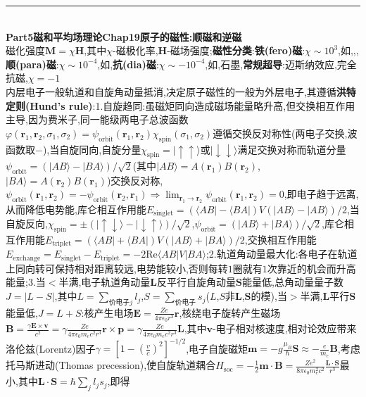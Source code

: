 \documentclass[UTF8,10pt,a4paper]{article}
\providecommand{\abs}[1]{\lvert#1\rvert}
\providecommand{\re}{\mathrm{Re}}
\begin{document}
\begin{multicols}{2}
\rule{\columnwidth}{.2pt}\\
\textbf{Part5磁和平均场理论Chap19原子的磁性:顺磁和逆磁}\\
磁化强度$\bm{M}=\chi\bm{H}$,其中$\chi$-磁极化率,$\bm{H}$-磁场强度;\textbf{磁性分类}:\textbf{铁(fero)磁}:$\chi\sim 10^3$,如,,,\textbf{顺(para)磁}:$\chi\sim 10^{-4}$,如,\textbf{抗(dia)磁}:$\chi\sim-10^{-4}$,如,石墨,\textbf{常规超导}:迈斯纳效应,完全抗磁,$\chi=-1$\\
内层电子一般轨道和自旋角动量抵消,决定原子磁性的一般为外层电子,其遵循\textbf{洪特定则(Hund's rule)}:1.自旋趋同:虽磁矩同向造成磁场能量略升高,但交换相互作用主导,因为费米子,同一能级两电子总波函数$\varphi(\bm{r}_1,\bm{r}_2,\sigma_1,\sigma_2)=\psi_{\text{orbit}}(\bm{r}_1,\bm{r}_2)\chi_{\text{spin}}(\sigma_1,\sigma_2)$遵循交换反对称性(两电子交换,波函数取$-$),当自旋同向,自旋分量$\chi_{\text{spin}}=\lvert\uparrow\uparrow\rangle$或$\lvert\downarrow\downarrow\rangle$满足交换对称而轨道分量$\psi_{\text{orbit}}=(\lvert AB\rangle-\lvert BA\rangle)/\sqrt{2}$(其中$\lvert AB\rangle=A(\bm{r}_1)B(\bm{r}_2)$,$\lvert BA\rangle=A(\bm{r}_2)B(\bm{r}_1)$)交换反对称,$\psi_{\text{orbit}}(\bm{r}_1,\bm{r}_2)=-\psi_{\text{orbit}}(\bm{r}_2,\bm{r}_1)\Rightarrow\lim_{\bm{r}_1\rightarrow\bm{r}_2}\psi_{\text{orbit}}(\bm{r}_1,\bm{r}_2)=0$,即电子趋于远离,从而降低电势能,库仑相互作用能$E_{\text{singlet}}=(\langle AB\rvert-\langle BA\rvert)V(\lvert AB\rangle-\lvert AB\rangle)/2$,当自旋反向,$\chi_{\text{spin}}=\pm(\lvert\uparrow\downarrow\rangle-\lvert\downarrow\uparrow\rangle)/\sqrt{2}$,$\psi_{\text{orbit}}=(\lvert AB\rangle+\lvert BA\rangle)/\sqrt{2}$,库仑相互作用能$E_{\text{triplet}}=(\langle AB\rvert+\langle BA\rvert)V(\lvert AB\rangle+\lvert BA\rangle)/2$,交换相互作用能$E_{\text{exchange}}=E_{\text{singlet}}-E_{\text{triplet}}=-2\re\langle AB\rvert V\lvert BA\rangle$;2.轨道角动量最大化:各电子在轨道上同向转可保持相对距离较远,电势能较小,否则每转$1$圈就有$1$次靠近的机会而升高能量;3.当$<$半满,电子轨道角动量$\bm{L}$反平行自旋角动量$\bm{S}$能量低,总角动量量子数$J=\abs{L-S}$,其中$L=\sum_{\text{价电子}j}l_j$,$S=\sum_{\text{价电子}}s_j$($L$,$S$非$\bm{L}$,$\bm{S}$的模),当$>$半满,$\bm{L}$平行$\bm{S}$能量低,$J=L+S$:核产生电场$\bm{E}=\frac{Ze}{4\pi\epsilon_0r^3}\bm{r}$,核绕电子旋转产生磁场$\bm{B}=\frac{\gamma\bm{E}\times\bm{v}}{c^2}=\gamma\frac{Ze}{4\pi\epsilon_0m_ec^2r^3}\bm{r}\times\bm{p}=\gamma\frac{Ze}{4\pi\epsilon_0m_ec^2r^3}\bm{L}$,其中$\bm{v}$-电子相对核速度,相对论效应带来洛伦兹(Lorentz)因子$\gamma=[1-(\frac{v}{c})^2]^{-1/2}$,电子自旋磁矩$\bm{m}=-g\frac{\mu_B}{\hbar}\bm{S}\approx-\frac{e}{m_e}\bm{B}$,考虑托马斯进动(Thomas precession),使自旋轨道耦合$H_{\text{soc}}=-\frac{1}{2}\bm{m}\cdot\bm{B}=\frac{Ze^2}{8\pi\epsilon_0m_e^2c^2}\frac{\bm{L}\cdot\bm{S}}{r^3}$最小,其中$\bm{L}\cdot\bm{S}=\hbar\sum_jl_js_j$,即得\\

\end{multicols}
\end{document}
